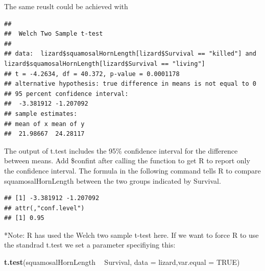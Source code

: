 \documentclass[]{article}
\newenvironment{Shaded}{\begin{snugshade}}{\end{snugshade}}
\newcommand{\DataTypeTok}[1]{\textcolor[rgb]{0.13,0.29,0.53}{#1}}
\newcommand{\KeywordTok}[1]{\textcolor[rgb]{0.13,0.29,0.53}{\textbf{#1}}}
\newcommand{\NormalTok}[1]{#1}
\newcommand{\OperatorTok}[1]{\textcolor[rgb]{0.81,0.36,0.00}{\textbf{#1}}}
\newcommand{\OtherTok}[1]{\textcolor[rgb]{0.56,0.35,0.01}{#1}}
\newcommand{\StringTok}[1]{\textcolor[rgb]{0.31,0.60,0.02}{#1}}
\begin{document}
The same reuslt could be achieved with

\begin{Shaded}
\end{Shaded}

\begin{verbatim}
## 
##  Welch Two Sample t-test
## 
## data:  lizard$squamosalHornLength[lizard$Survival == "killed"] and lizard$squamosalHornLength[lizard$Survival == "living"]
## t = -4.2634, df = 40.372, p-value = 0.0001178
## alternative hypothesis: true difference in means is not equal to 0
## 95 percent confidence interval:
##  -3.381912 -1.207092
## sample estimates:
## mean of x mean of y 
##  21.98667  24.28117
\end{verbatim}

The output of t.test includes the 95\% confidence interval for the
difference between means. Add \$confint after calling the function to
get R to report only the confidence interval. The formula in the
following command tells R to compare squamosalHornLength between the two
groups indicated by Survival.

\begin{Shaded}
\end{Shaded}

\begin{verbatim}
## [1] -3.381912 -1.207092
## attr(,"conf.level")
## [1] 0.95
\end{verbatim}

*Note: R has used the Welch two sample t-test here. If we want to force
R to use the standrad t.test we set a parameter specifiying this:

\begin{Shaded}
\begin{Highlighting}[]
\KeywordTok{t.test}\NormalTok{(squamosalHornLength }\OperatorTok{~}\StringTok{ }\NormalTok{Survival, }\DataTypeTok{data =}\NormalTok{ lizard,}\DataTypeTok{var.equal =} \OtherTok{TRUE}\NormalTok{)}
\end{Highlighting}
\end{Shaded}
\end{document}

